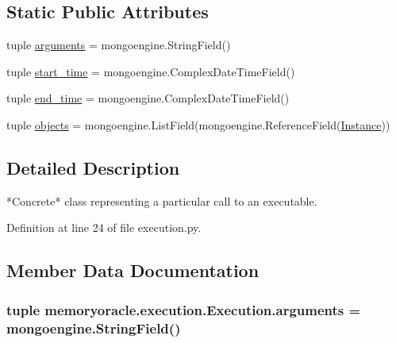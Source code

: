 \subsection*{Static Public Attributes}
\begin{DoxyCompactItemize}
\item 
tuple \hyperlink{classmemoryoracle_1_1execution_1_1Execution_a663a215430b1923fdbdc15e4a081c241}{arguments} = mongoengine.\+String\+Field()
\item 
tuple \hyperlink{classmemoryoracle_1_1execution_1_1Execution_abe961abfe6caa800e16358a58572eff3}{start\+\_\+time} = mongoengine.\+Complex\+Date\+Time\+Field()
\item 
tuple \hyperlink{classmemoryoracle_1_1execution_1_1Execution_ac03f8d74970a2dcf7e84bf109052118c}{end\+\_\+time} = mongoengine.\+Complex\+Date\+Time\+Field()
\item 
tuple \hyperlink{classmemoryoracle_1_1execution_1_1Execution_a3aeb1a80427e0101619b2db1c43e7e0c}{objects} = mongoengine.\+List\+Field(mongoengine.\+Reference\+Field(\hyperlink{classmemoryoracle_1_1execution_1_1Instance}{Instance}))
\end{DoxyCompactItemize}


\subsection{Detailed Description}
\begin{DoxyVerb}*Concrete* class representing a particular call to an executable.
\end{DoxyVerb}
 

Definition at line 24 of file execution.\+py.



\subsection{Member Data Documentation}
\hypertarget{classmemoryoracle_1_1execution_1_1Execution_a663a215430b1923fdbdc15e4a081c241}{}
\subsubsection[{arguments}]{\setlength{\rightskip}{0pt plus 5cm}tuple memoryoracle.\+execution.\+Execution.\+arguments = mongoengine.\+String\+Field()\hspace{0.3cm}{\ttfamily [static]}}\label{classmemoryoracle_1_1execution_1_1Execution_a663a215430b1923fdbdc15e4a081c241}


